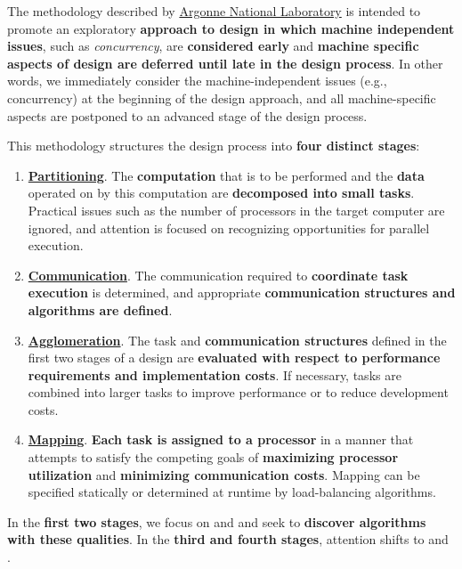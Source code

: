 \noindent
The  methodology described by \href{https://www.mcs.anl.gov/~itf/dbpp/text/node15.html}{Argonne National Laboratory} is intended to promote an exploratory \textbf{approach to design in which machine independent issues}, such as \emph{concurrency}, are \textbf{considered early} and \textbf{machine specific aspects of design are deferred until late in the design process}. In other words, we immediately consider the machine-independent issues (e.g., concurrency) at the beginning of the design approach, and all machine-specific aspects are postponed to an advanced stage of the design process.

\newpage
\noindent
This methodology structures the design process into \textbf{four distinct stages}: 
\begin{enumerate}
    \item \textbf{\underline{Partitioning}}. The \textbf{computation} that is to be performed and the \textbf{data} operated on by this computation are \textbf{decomposed into small tasks}. Practical issues such as the number of processors in the target computer are ignored, and attention is focused on recognizing opportunities for parallel execution.

    \item \textbf{\underline{Communication}}. The communication required to \textbf{coordinate task execution} is determined, and appropriate \textbf{communication structures and algorithms are defined}.

    \item \textbf{\underline{Agglomeration}}. The task and \textbf{communication structures} defined in the first two stages of a design are \textbf{evaluated with respect to performance requirements and implementation costs}. If necessary, tasks are combined into larger tasks to improve performance or to reduce development costs.     

    \item \textbf{\underline{Mapping}}. \textbf{Each task is assigned to a processor} in a manner that attempts to satisfy the competing goals of \textbf{maximizing processor utilization} and \textbf{minimizing communication costs}. Mapping can be specified statically or determined at runtime by load-balancing algorithms.
\end{enumerate}
In the \textbf{first two stages}, we focus on  and  and seek to \textbf{discover algorithms with these qualities}. In the \textbf{third and fourth stages}, attention shifts to  and .
